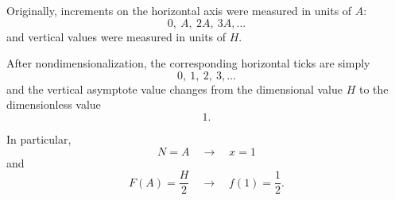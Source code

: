 \documentclass[12pt]{amsart}
\theoremstyle{conjecture}
\theoremstyle{definition}
\theoremstyle{question}
\theoremstyle{theorem}
\begin{document}
\begin{enumerate}[label=(\alph*)]
\begin{center}
        \end{center}

        Originally, increments on the horizontal axis were measured in units
        of \(A\):
        \[
            0,\ A,\ 2A,\ 3A,\ldots
        \]
        and vertical values were measured in units of \(H\).

        After nondimensionalization, the corresponding horizontal ticks are
        simply
        \[
            0,\ 1,\ 2,\ 3,\ldots
        \]
        and the vertical asymptote value changes from the dimensional value
        \(H\) to the dimensionless value
        \[
            1.
        \]

        In particular,
        \[
            \boxed{
                N=A
                \quad\longrightarrow\quad
                x=1
            }
        \]
        and
        \[
            \boxed{
                F(A)=\frac{H}{2}
                \quad\longrightarrow\quad
                f(1)=\frac12.
            }
        \]

    \end{enumerate}
\end{document}
